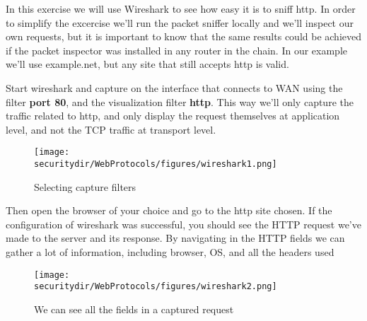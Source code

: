 \begin{Exercise}[label={webprotocols-http-practs}]
In this exercise we will use Wireshark to see how easy it is to sniff http. In order to simplify the excercise we'll run the packet sniffer locally and we'll inspect our own requests, but it is important to know that the same results could be achieved if the packet inspector was installed in any router in the chain. In our example we'll use example.net, but any site that still accepts http  is valid.


Start wireshark and capture on the interface that connects to WAN using the filter \textbf{port 80}, and the visualization filter \textbf{http}. This way we'll only capture the traffic related to http, and only display the request themselves at application level, and not the TCP traffic at transport level.
\begin{figure}[htb]
	\begin{centering}
		\texttt{[image: \\securitydir/WebProtocols/figures/wireshark1.png]}
		\par
	\end{centering}
	\caption{\label{fig:wireshark1} Selecting capture filters}
\end{figure}

Then open the browser of your choice and go to the http site chosen. If the configuration of wireshark was successful, you should see the HTTP request we've made to the server and its response. By navigating in the HTTP fields we can gather a lot of information, including browser, OS, and all the headers used
\begin{figure}[htb]
	\begin{centering}
		\texttt{[image: \\securitydir/WebProtocols/figures/wireshark2.png]}
		\par\end{centering}
	\caption{\label{fig:wireshark1} We can see all the fields in a captured request}
\end{figure}


\end{Exercise}
